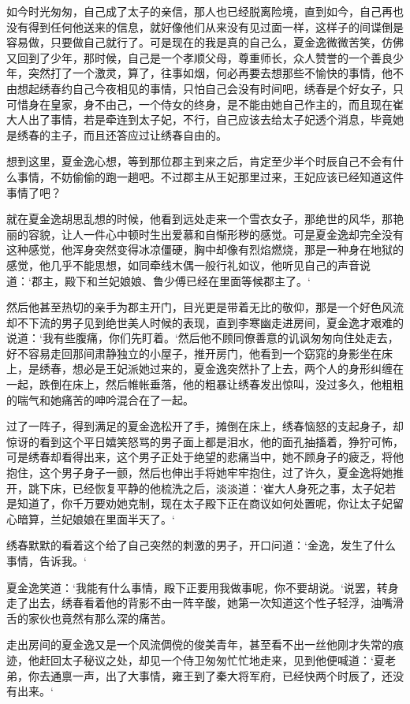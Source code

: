 如今时光匆匆，自己成了太子的亲信，那人也已经脱离险境，直到如今，自己再也没有得到任何他送来的信息，就好像他们从来没有见过面一样，这样子的间谍倒是容易做，只要做自己就行了。可是现在的我是真的自己么，夏金逸微微苦笑，仿佛又回到了少年，那时候，自己是一个孝顺父母，尊重师长，众人赞誉的一个善良少年，突然打了一个激灵，算了，往事如烟，何必再要去想那些不愉快的事情，他不由想起绣春约自己今夜相见的事情，只怕自己会没有时间吧，绣春是个好女子，只可惜身在皇家，身不由己，一个侍女的终身，是不能由她自己作主的，而且现在崔大人出了事情，若是牵连到太子妃，不行，自己应该去给太子妃透个消息，毕竟她是绣春的主子，而且还答应过让绣春自由的。

想到这里，夏金逸心想，等到那位郡主到来之后，肯定至少半个时辰自己不会有什么事情，不妨偷偷的跑一趟吧。不过郡主从王妃那里过来，王妃应该已经知道这件事情了吧？

就在夏金逸胡思乱想的时候，他看到远处走来一个雪衣女子，那绝世的风华，那艳丽的容貌，让人一件心中顿时生出爱慕和自惭形秽的感觉。可是夏金逸却完全没有这种感觉，他浑身突然变得冰凉僵硬，胸中却像有烈焰燃烧，那是一种身在地狱的感觉，他几乎不能思想，如同牵线木偶一般行礼如议，他听见自己的声音说道：‘郡主，殿下和兰妃娘娘、鲁少傅已经在里面等候郡主了。‘

然后他甚至热切的亲手为郡主开门，目光更是带着无比的敬仰，那是一个好色风流却不下流的男子见到绝世美人时候的表现，直到李寒幽走进房间，夏金逸才艰难的说道：‘我有些腹痛，你们先盯着。‘然后他不顾同僚善意的讥讽匆匆向住处走去，好不容易走回那间肃静独立的小屋子，推开房门，他看到一个窈窕的身影坐在床上，是绣春，想必是王妃派她过来的，夏金逸突然扑了上去，两个人的身形纠缠在一起，跌倒在床上，然后帷帐垂落，他的粗暴让绣春发出惊叫，没过多久，他粗粗的喘气和她痛苦的呻吟混合在了一起。

过了一阵子，得到满足的夏金逸松开了手，摊倒在床上，绣春恼怒的支起身子，却惊讶的看到这个平日嬉笑怒骂的男子面上都是泪水，他的面孔抽搐着，狰狞可怖，可是绣春却看得出来，这个男子正处于绝望的悲痛当中，她不顾身子的疲乏，将他抱住，这个男子身子一颤，然后也伸出手将她牢牢抱住，过了许久，夏金逸将她推开，跳下床，已经恢复平静的他梳洗之后，淡淡道：‘崔大人身死之事，太子妃若是知道了，你千万要劝她克制，现在太子殿下正在商议如何处置呢，你让太子妃留心暗算，兰妃娘娘在里面半天了。‘

绣春默默的看着这个给了自己突然的刺激的男子，开口问道：‘金逸，发生了什么事情，告诉我。‘

夏金逸笑道：‘我能有什么事情，殿下正要用我做事呢，你不要胡说。‘说罢，转身走了出去，绣春看着他的背影不由一阵辛酸，她第一次知道这个性子轻浮，油嘴滑舌的家伙也竟然有那么深的痛苦。

走出房间的夏金逸又是一个风流倜傥的俊美青年，甚至看不出一丝他刚才失常的痕迹，他赶回太子秘议之处，却见一个侍卫匆匆忙忙地走来，见到他便喊道：‘夏老弟，你去通禀一声，出了大事情，雍王到了秦大将军府，已经快两个时辰了，还没有出来。‘

